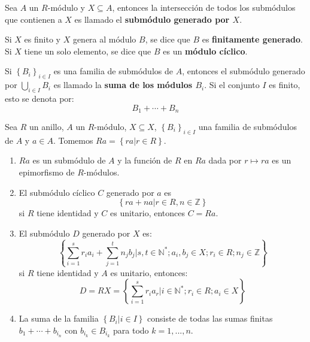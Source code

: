 \documentclass[12pt]{report}
\newcounter{it}
\theoremstyle{largebreak}
\begin{document}
    \begin{mydef}
        Sea $A$ un $R$-módulo y $X\subseteq A$, entonces la intersección de todos los submódulos que contienen a $X$ es llamado el \textbf{submódulo generado por $X$}.
    \end{mydef}

    Si $X$ es finito y $X$ genera al módulo $B$, se dice que $B$ es \textbf{finitamente generado}. Si $X$ tiene un solo elemento, se dice que $B$ es un \textbf{módulo cíclico}.

    Si $\left\{B_i \right\}_{ i\in I}$ es una familia de submódulos de $A$, entonces el submódulo generado por $\bigcup_{ i\in I}B_i$ es llamado la \textbf{suma de los módulos $B_i$}. Si el conjunto $I$ es finito, esto se denota por:
    \begin{equation*}
        B_1+\cdots+B_n
    \end{equation*}

    \begin{theor}
        Sea $R$ un anillo, $A$ un $R$-módulo, $X\subseteq X$, $\left\{B_i \right\}_{ i\in I}$ una familia de submódulos de $A$ y $a\in A$. Tomemos $Ra=\left\{ra\Big|r\in R \right\}$.
        \begin{enumerate}[label = \textit{(\alph*)}]
            \item $Ra$ es un submódulo de $A$ y la función de $R$ en $Ra$ dada por $r\mapsto ra$ es un epimorfismo de $R$-módulos.
            \item El submódulo cíclico $C$ generado por $a$ es
            \begin{equation*}
                \left\{ra+na\Big|r\in R,n\in\mathbb{Z} \right\}
            \end{equation*}
            si $R$ tiene identidad y $C$ es unitario, entonces $C=Ra$.
            \item El submódulo $D$ generado por $X$ es:
            \begin{equation*}
                \left\{\sum_{ i=1}^s r_ia_i+\sum_{ j=1}^t n_jb_j\Big|s,t\in\mathbb{N}^*;a_i,b_j\in X;r_i\in R;n_j\in\mathbb{Z} \right\}
            \end{equation*}
            si $R$ tiene identidad y $A$ es unitario, entonces:
            \begin{equation*}
                D=RX=\left\{\sum_{ i=1}^s r_ia_r\Big|i\in\mathbb{N}^*;r_i\in R;a_i\in X \right\}
            \end{equation*}
            \item La suma de la familia $\left\{B_i\Big|i\in I \right\}$ consiste de todas las sumas finitas $b_1+\cdots+b_{ i_n}$ con $b_{ i_k}\in B_{ i_k}$ para todo $k=1,...,n$.
        \end{enumerate}
    \end{theor}
\end{document}

